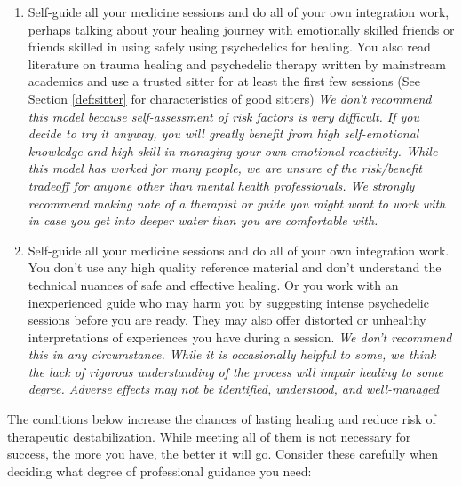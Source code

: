 \documentclass[12pt,letterpaper]{article}
\begin{document}
\begin{enumerate}
    \item Self-guide all your medicine sessions and do all of your own integration work, perhaps talking about your healing journey with emotionally skilled friends or friends skilled in using safely using psychedelics for healing. You also read literature on trauma healing and psychedelic therapy written by mainstream academics and use a trusted sitter for at least the first few sessions (See Section \ref{def:sitter} for characteristics of good sitters) \textit{We don't recommend this model because self-assessment of risk factors is very difficult. If you decide to try it anyway, you will greatly benefit from high self-emotional knowledge and high skill in managing your own emotional reactivity. While this model has worked for many people, we are unsure of the risk/benefit tradeoff for anyone other than mental health professionals. We strongly recommend making note of a therapist or guide you might want to work with in case you get into deeper water than you are comfortable with.} 
    \item Self-guide all your medicine sessions and do all of your own integration work. You don't use any high quality reference material and don't understand the technical nuances of safe and effective healing. Or you work with an inexperienced guide who may harm you by suggesting intense psychedelic sessions before you are ready. They may also offer distorted or unhealthy interpretations of experiences you have during a session. \textit{We don't recommend this in any circumstance. While it is occasionally helpful to some, we think the lack of rigorous understanding of the process will impair healing to some degree. Adverse effects may not be identified, understood, and well-managed} 
\end{enumerate}
The conditions below increase the chances of lasting healing and reduce risk of therapeutic destabilization. While meeting all of them is not necessary for success, the more you have, the better it will go. Consider these carefully when deciding what degree of professional guidance you need:  
\end{document}
